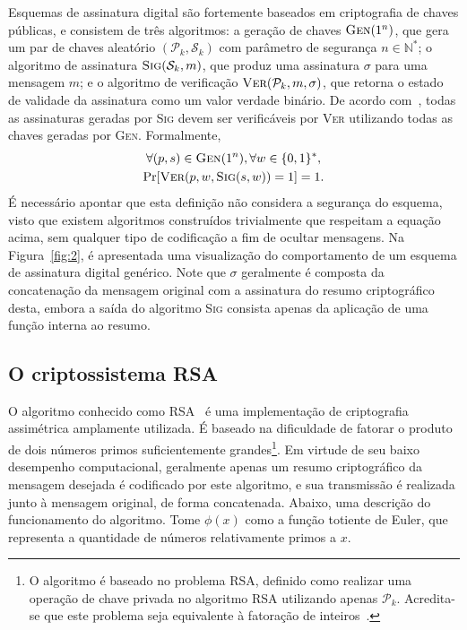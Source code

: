 \documentclass{ufsctex/ufsctex}
\newcommand{\pk}{\mathcal{P}_{k}}
\newcommand{\sk}{\mathcal{S}_{k}}
\newcommand{\binwds}[1]{\{0, 1\}^{#1}}
\begin{document}
Esquemas de assinatura digital são fortemente baseados em criptografia de
chaves públicas, e consistem de três algoritmos: a geração de chaves
$\textsc{Gen}(1^{n})$, que gera um par de chaves aleatório $(\pk{}, \sk{})$ com
parâmetro de segurança $n \in \mathbb{N}^{*}$; o algoritmo de assinatura
$\textsc{Sig}(\sk{}, m)$, que produz uma assinatura $\sigma$ para uma mensagem
$m$; e o algoritmo de verificação $\textsc{Ver}(\pk{}, m, \sigma)$, que retorna
o estado de validade da assinatura como um valor verdade binário. De acordo
com~\cite[Subseção 6.1.3]{Goldreich:book:2004}, todas as assinaturas geradas
por \textsc{Sig} devem ser verificáveis por \textsc{Ver} utilizando todas as
chaves geradas por \textsc{Gen}. Formalmente,
\begin{multline}
  \forall (p, s) \in \textsc{Gen}(1^{n}), \forall w \in \binwds{*}, \\
    \text{Pr}[\textsc{Ver}(p, w, \textsc{Sig}(s, w)) = 1] = 1.
\end{multline}
É necessário apontar que esta definição não considera a segurança do esquema,
visto que existem algoritmos construídos trivialmente que respeitam a equação
acima, sem qualquer tipo de codificação a fim de ocultar mensagens. Na
Figura~\ref{fig:2}, é apresentada uma visualização do comportamento de um
esquema de assinatura digital genérico. Note que $\sigma$ geralmente é composta
da concatenação da mensagem original com a assinatura do resumo criptográfico
desta, embora a saída do algoritmo \textsc{Sig} consista apenas da aplicação de
uma função interna ao resumo.

\subsection{O criptossistema RSA}\label{subsection:rsa}

O algoritmo conhecido como
RSA~\cite{Rivest:article:1978:feb}
é uma implementação de criptografia assimétrica amplamente utilizada. É baseado
na dificuldade de fatorar o produto de dois números primos suficientemente
grandes\footnote{O algoritmo é baseado no problema RSA, definido como realizar
uma operação de chave privada no algoritmo RSA utilizando apenas $\pk{}$.
Acredita-se que este problema seja equivalente à fatoração de
inteiros~\cite[Fato 3.30]{Menezes:book:1996}.}. Em virtude de seu baixo
desempenho computacional, geralmente apenas um resumo criptográfico da mensagem
desejada é codificado por este algoritmo, e sua transmissão é realizada junto à
mensagem original, de forma concatenada. Abaixo, uma descrição do funcionamento
do algoritmo. Tome $\phi(x)$ como a função totiente de Euler, que representa a
quantidade de números relativamente primos a $x$.
\end{document}
